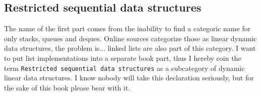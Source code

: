 \begin{partbacktext}

\part{Restricted sequential data structures} \label{pt:one}
\noindent The name of the first part comes from the inability to find a categoric name for only stacks, queues and deques. 
Online sources categorize those as linear dynamic data structures, the problem is... linked lists are also part of this category. 
I want to put list implementations into a separate book part, thus I hereby coin the term {\normalfont\texttt{Restricted sequential data structures}} as a subcategory of dynamic linear data structures.
I know nobody will take this declaration seriously, but for the sake of this book please bear with it.

\end{partbacktext}
